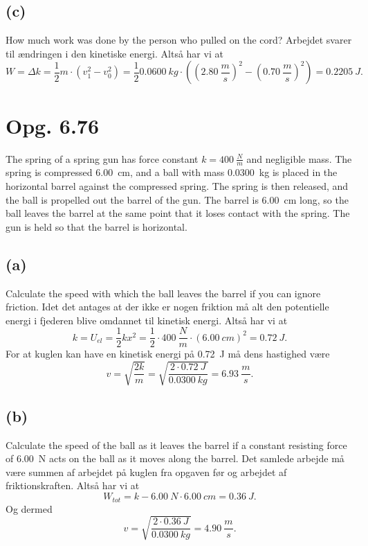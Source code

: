 \documentclass[12pt]{article}
\begin{document}
\subsection*{(c)}
How much work was done by the person who pulled on the cord?
\bigbreak
Arbejdet svarer til ændringen i den kinetiske energi. Altså har vi at
\[
W = \Delta k = \frac{1}{2}m\cdot \left( v_1^2-v_0^2 \right) = \frac{1}{2}\qty{0,0600}{kg} \cdot \left( \left( \qty{2,80}{\frac{m}{s}} \right)^2 - \left( \qty{0,70}{\frac{m}{s}} \right)^2 \right) = \qty{0,2205}{J}
.\] 

\section*{Opg. 6.76}
The spring of a spring gun has force constant $k = \qty{400}{\frac{N}{m}}$ and negligible mass. The spring is compressed \qty{6,00}{cm}, and a ball with mass \qty{0,0300}{kg} is placed in the horizontal barrel against the compressed spring. The spring is then released, and the ball is propelled out the barrel of the gun. The barrel is \qty{6,00}{cm} long, so the ball leaves the barrel at the same point that it loses contact with the spring. The gun is held so that the barrel is horizontal.


\subsection*{(a)}
Calculate the speed with which the ball leaves the barrel if you can ignore friction.
\bigbreak
Idet det antages at der ikke er nogen friktion må alt den potentielle energi i fjederen blive omdannet til kinetisk energi. Altså har vi at
\[
k = U_{el} = \frac{1}{2}kx^2 = \frac{1}{2}\cdot \qty{400}{\frac{N}{m}}\cdot \left( \qty{6,00}{cm} \right)^2 = \qty{0,72}{J}
.\] 
For at kuglen kan have en kinetisk energi på \qty{0,72}{J} må dens hastighed være
\[
v = \sqrt{\frac{2k}{m}} = \sqrt{\frac{2\cdot \qty{0,72}{J}}{\qty{0,0300}{kg}}} = \qty{6,93}{\frac{m}{s}}  
.\] 

\subsection*{(b)}
Calculate the speed of the ball as it leaves the barrel if a constant resisting force of \qty{6,00}{N} acts on the ball as it moves along the barrel.
\bigbreak
Det samlede arbejde må være summen af arbejdet på kuglen fra opgaven før og arbejdet af friktionskraften. Altså har vi at
\[
W_{tot} = k - \qty{6,00}{N}\cdot \qty{6,00}{cm} = \qty{0,36}{J}
.\] 
Og dermed
\[
v = \sqrt{\frac{2\cdot \qty{0,36}{J}}{\qty{0,0300}{kg}}} = \qty{4,90}{\frac{m}{s}}
.\] 
\end{document}
